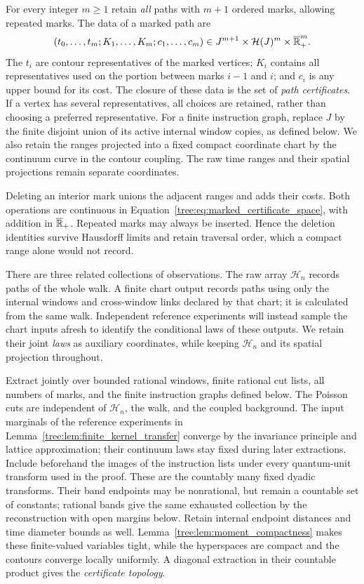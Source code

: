 For every integer $m\geq1$ retain \emph{all} paths with $m+1$ ordered marks,
allowing repeated marks.  The data of a marked path are
\begin{equation}\label{tree:eq:marked_certificate_space}
 (t_0,\ldots,t_m;K_1,\ldots,K_m;c_1,\ldots,c_m)
 \in J^{m+1}\times\mathcal H(J)^m\times\overline{\mathbb R}_+^m.
\end{equation}
The $t_i$ are contour representatives of the marked vertices; $K_i$ contains
all representatives used on the portion between marks $i-1$ and $i$; and
$c_i$ is any upper bound for its cost. The closure of these data is the
set of \emph{path certificates}. If a vertex has several representatives, all choices are
retained, rather than choosing a preferred representative.  For a finite
instruction graph, replace $J$ by the finite disjoint union of its active
internal window copies, as defined below.
We also retain the ranges projected into a fixed compact coordinate
chart by the continuum curve in the contour coupling. The raw time
ranges and their spatial projections remain separate coordinates.

Deleting an interior mark unions the adjacent ranges and adds their
costs. Both operations are continuous in
Equation~\eqref{tree:eq:marked_certificate_space}, with addition in
$\overline{\mathbb R}_+$. Repeated marks may always be inserted. Hence the
deletion identities survive Hausdorff limits and retain traversal order,
which a compact range alone would not record.

There are three related collections of observations. The raw array
$\mathcal H_n$ records paths of the whole walk. A finite chart output
records paths using only the internal windows and cross-window links
declared by that chart; it is calculated from the same walk. Independent
reference experiments will instead sample the chart inputs afresh to
identify the conditional laws of these outputs. We retain their joint
\emph{laws} as auxiliary coordinates, while keeping $\mathcal H_n$
and its spatial projection throughout.

Extract jointly over bounded rational windows, finite rational cut lists,
all numbers of marks, and the finite instruction graphs defined below.
The Poisson cuts are independent of $\mathcal H_n$, the walk, and the
coupled background. The input marginals of the reference experiments
in Lemma~\ref{tree:lem:finite_kernel_transfer} converge by the invariance
principle and lattice approximation; their continuum laws stay fixed
during later extractions. Include beforehand the images of the instruction
lists under every quantum-unit transform used in the proof. These are
the countably many fixed dyadic transforms. Their band endpoints may
be nonrational, but remain a countable set of constants; rational bands
give the same exhausted collection by the reconstruction with open
margins below.
Retain internal endpoint distances and time diameter bounds as well.
Lemma~\ref{tree:lem:moment_compactness} makes these finite-valued variables
tight, while the hyperspaces are compact and the contours converge
locally uniformly. A diagonal extraction in their countable product
gives the \emph{certificate topology}.


